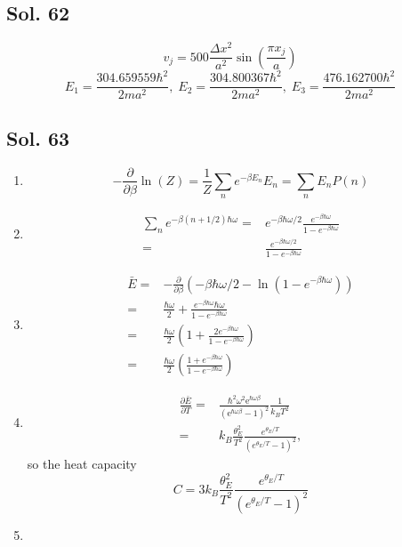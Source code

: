 \subsection*{Sol. 62}
$$
v_j=500\frac{\Delta x^2}{a^2}\sin\left(\frac{\pi x_j}{a}\right)
$$
$$
E_1=\frac{304.659559\hbar^2}{2ma^2},\;
E_2=\frac{304.800367\hbar^2}{2ma^2},\;
E_3=\frac{476.162700\hbar^2}{2ma^2}
$$

\subsection*{Sol. 63}
\begin{enumerate}
    \item 
    $$
    -\frac{\partial}{\partial\beta}
    \ln(Z)
    =\frac{1}{Z}
    \sum_ne^{-\beta E_n}E_n
    =\sum_nE_nP(n)
    $$
    \item 
    \begin{align*}
        \sum_ne^{-\beta(n+1/2)\hbar\omega}
        =& e^{-\beta\hbar\omega/2}
        \frac{e^{-\beta\hbar\omega}}{1-e^{-\beta\hbar\omega}}\\
        =&
        \frac{e^{-\beta\hbar\omega/2}}{1-e^{-\beta\hbar\omega}}
    \end{align*}
    \item 
    \begin{align*}
        \bar{E} = &
        -\frac{\partial}{\partial\beta}
        (-\beta\hbar\omega/2-
        \ln(1-e^{-\beta\hbar\omega})
        )\\
        =&\frac{\hbar\omega}{2}
        +\frac{e^{-\beta\hbar\omega}
        \hbar\omega}{1-e^{-\beta\hbar\omega}}\\
        =&\frac{\hbar\omega}{2}
        \left(
        1+\frac{2e^{-\beta\hbar\omega}
        }
        {1-e^{-\beta\hbar\omega}}
        \right)\\
        =&
        \frac{\hbar\omega}{2}\left(
        \frac{1+e^{-\beta\hbar\omega}
        }
        {1-e^{-\beta\hbar\omega}}
        \right)
    \end{align*}
    \item 
    \begin{align*}
        \frac{\partial\bar{E}}{\partial T}
        =&
        \frac{\hbar^{2} {\omega}^{2} \mathrm{e}^{\hbar{\omega}{\beta}}}{\left(\mathrm{e}^{\hbar{\omega}{\beta}} - 1\right)^{2}}
        \frac{1}{k_BT^2}\\
        =&
        k_B
        \frac{\theta^2_E}{T^2}
        \frac{e^{\theta_E/T}}
        {(e^{\theta_E/T}-1)^2},
    \end{align*}
    so the heat capacity 
    $$
    C=
    3
    k_B
        \frac{\theta^2_E}{T^2}
        \frac{e^{\theta_E/T}}
        {(e^{\theta_E/T}-1)^2}
    $$
    \item 
    
\end{enumerate}

